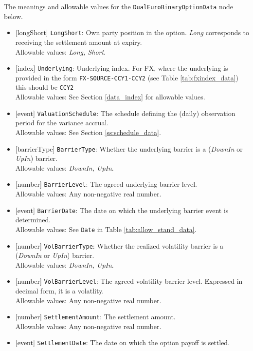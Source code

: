 The meanings and allowable values for the \lstinline!DualEuroBinaryOptionData! node below.
\begin{itemize}
  \item{}[longShort] \lstinline!LongShort!: Own party position in the option. \emph{Long} corresponds to receiving the settlement amount at expiry. \\
  Allowable values: \emph{Long, Short}.
  \item{}[index] \lstinline!Underlying!: Underlying index. For FX, where the underlying is provided in the form \lstinline!FX-SOURCE-CCY1-CCY2! (see Table \ref{tab:fxindex_data}) this should be \lstinline!CCY2!\\
  Allowable values: See Section \ref{data_index} for allowable values.
  \item{}[event] \lstinline!ValuationSchedule!: The schedule defining the (daily) observation period for the variance accrual. \\
  Allowable values: See Section \ref{ss:schedule_data}.
  \item{}[barrierType] \lstinline!BarrierType!: Whether the underlying barrier is a (\emph{DownIn} or \emph{UpIn}) barrier. \\
  Allowable values: \emph{DownIn, UpIn}.
  \item{}[number] \lstinline!BarrierLevel!: The agreed underlying barrier level. \\
  Allowable values: Any non-negative real number.
  \item{}[event] \lstinline!BarrierDate!: The date on which the underlying barrier event is determined. \\
  Allowable values: See \lstinline!Date! in Table \ref{tab:allow_stand_data}.
  \item{}[number] \lstinline!VolBarrierType!: Whether the realized volatility barrier is a (\emph{DownIn} or \emph{UpIn}) barrier. \\
  Allowable values: \emph{DownIn, UpIn}.
  \item{}[number] \lstinline!VolBarrierLevel!: The agreed volatility barrier level. Expressed in decimal form, it is a volatlity.\\
  Allowable values: Any non-negative real number.
  \item{}[number] \lstinline!SettlementAmount!: The settlement amount. \\
  Allowable values: Any non-negative real number.
  \item{}[event] \lstinline!SettlementDate!: The date on which the option payoff is settled. \\

\end{itemize}
